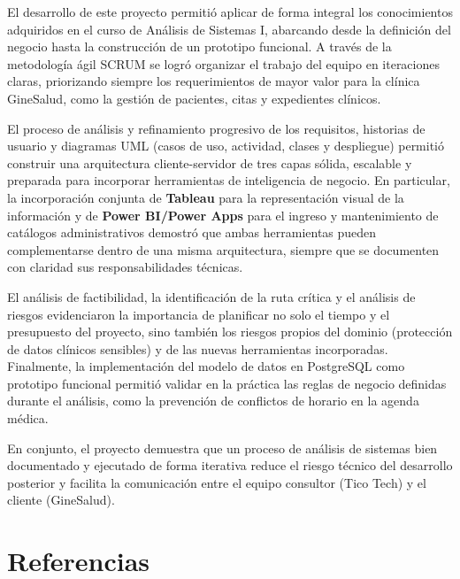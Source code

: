 \documentclass[12pt,letterpaper]{article}
\begin{document}

El desarrollo de este proyecto permitió aplicar de forma integral los conocimientos
adquiridos en el curso de Análisis de Sistemas I, abarcando desde la definición del negocio
hasta la construcción de un prototipo funcional. A través de la metodología ágil SCRUM se
logró organizar el trabajo del equipo en iteraciones claras, priorizando siempre los
requerimientos de mayor valor para la clínica GineSalud, como la gestión de pacientes, citas
y expedientes clínicos.

El proceso de análisis y refinamiento progresivo de los requisitos, historias de usuario y
diagramas UML (casos de uso, actividad, clases y despliegue) permitió construir una
arquitectura cliente-servidor de tres capas sólida, escalable y preparada para incorporar
herramientas de inteligencia de negocio. En particular, la incorporación conjunta de
\textbf{Tableau} para la representación visual de la información y de \textbf{Power
BI/Power Apps} para el ingreso y mantenimiento de catálogos administrativos demostró
que ambas herramientas pueden complementarse dentro de una misma arquitectura,
siempre que se documenten con claridad sus responsabilidades técnicas.

El análisis de factibilidad, la identificación de la ruta crítica y el análisis de riesgos
evidenciaron la importancia de planificar no solo el tiempo y el presupuesto del proyecto,
sino también los riesgos propios del dominio (protección de datos clínicos sensibles) y de
las nuevas herramientas incorporadas. Finalmente, la implementación del modelo de datos
en PostgreSQL como prototipo funcional permitió validar en la práctica las reglas de
negocio definidas durante el análisis, como la prevención de conflictos de horario en la
agenda médica.

En conjunto, el proyecto demuestra que un proceso de análisis de sistemas bien
documentado y ejecutado de forma iterativa reduce el riesgo técnico del desarrollo
posterior y facilita la comunicación entre el equipo consultor (Tico Tech) y el cliente
(GineSalud).

\section{Referencias}
\end{document}
